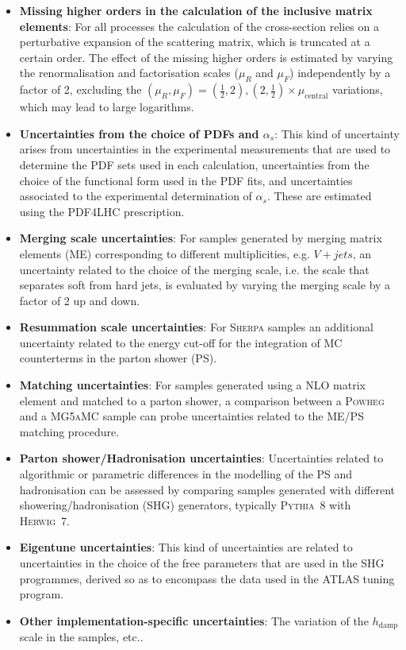 \begin{itemize}
    \item \textbf{Missing higher orders in the calculation of the inclusive matrix elements}: For all processes the calculation of the cross-section relies on a perturbative expansion of the scattering matrix, which is truncated at a certain order. The effect of the missing higher orders is estimated by varying the renormalisation and factorisation scales ($\mu_R$ and $\mu_F$) independently by a factor of 2, excluding the $(\mu_R,\mu_F)=(\frac{1}{2},2),(2,\frac{1}{2})\times \mu_{\text{central}}$ variations, which may lead to large logarithms. 
    \item \textbf{Uncertainties from the choice of PDFs and $\alpha_s$}: This kind of uncertainty arises from uncertainties in the experimental measurements that are used to determine the PDF sets used in each calculation, uncertainties from the choice of the functional form used in the PDF fits, and uncertainties associated to the experimental determination of $\alpha_s$. These are estimated using the PDF4LHC prescription\cite{Butterworth_2016}.
    \item \textbf{Merging scale uncertainties}: For samples generated by merging matrix elements (ME) corresponding to different multiplicities, e.g. $V+jets$, an uncertainty related to the choice of the merging scale, i.e. the scale that separates soft from hard jets, is evaluated by varying the merging scale by a factor of 2 up and down.
    \item \textbf{Resummation scale uncertainties}: For \textsc{Sherpa}\cite{Gleisberg_2009} samples an additional uncertainty related to the energy cut-off for the integration of MC counterterms in the parton shower (PS).
    \item \textbf{Matching uncertainties}: For samples generated using a NLO matrix element and matched to a parton shower, a comparison between a \textsc{Powheg} and a \textsc{MG5aMC} sample can probe uncertainties related to the ME/PS matching procedure.
    \item \textbf{Parton shower/Hadronisation uncertainties}: Uncertainties related to algorithmic or parametric differences in the modelling of the PS and hadronisation can be assessed by comparing samples generated with different showering/hadronisation (SHG) generators, typically \textsc{Pythia~8} with \textsc{Herwig~7}.  
    \item \textbf{Eigentune uncertainties}: This kind of uncertainties are related to uncertainties in the choice of the free parameters that are used in the SHG programmes, derived so as to encompass the data used in the ATLAS tuning program\cite{ATL-PHYS-PUB-2014-021}.
    \item \textbf{Other implementation-specific uncertainties}: The variation of the $h_{\text{damp}}$ scale in the  samples, etc..
\end{itemize}

